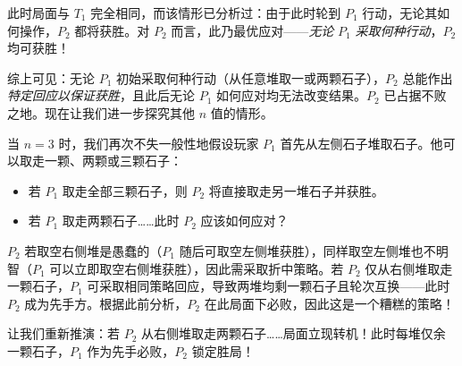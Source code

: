 此时局面与 $T_1$ 完全相同，而该情形已分析过：由于此时轮到 $P_1$ 行动，无论其如何操作，$P_2$ 都将获胜。对 $P_2$ 而言，此乃最优应对——\emph{无论} $P_1$ \emph{采取何种行动}，$P_2$ 均可获胜！

综上可见：无论 $P_1$ 初始采取何种行动（从任意堆取一或两颗石子），$P_2$ 总能作出\emph{特定回应以保证获胜}，且此后无论 $P_1$ 如何应对均无法改变结果。$P_2$ 已占据不败之地。现在让我们进一步探究其他 $n$ 值的情形。

当 $n = 3$ 时，我们再次不失一般性地假设玩家 $P_1$ 首先从左侧石子堆取石子。他可以取走一颗、两颗或三颗石子：
\begin{itemize}
    \item 若 $P_1$ 取走全部三颗石子，则 $P_2$ 将直接取走另一堆石子并获胜。
    \item 若 $P_1$ 取走两颗石子……此时 $P_2$ 应该如何应对？
\end{itemize}
$P_2$ 若取空右侧堆是愚蠢的（$P_1$ 随后可取空左侧堆获胜），同样取空左侧堆也不明智（$P_1$ 可以立即取空右侧堆获胜），因此需采取折中策略。若 $P_2$ 仅从右侧堆取走一颗石子，$P_1$ 可采取相同策略回应，导致两堆均剩一颗石子且轮次互换——此时 $P_2$ 成为先手方。根据此前分析，$P_2$ 在此局面下必败，因此这是一个糟糕的策略！

\begin{center}
\end{center}

让我们重新推演：若 $P_2$ 从右侧堆取走两颗石子……局面立现转机！此时每堆仅余一颗石子，$P_1$ 作为先手必败，$P_2$ 锁定胜局！

